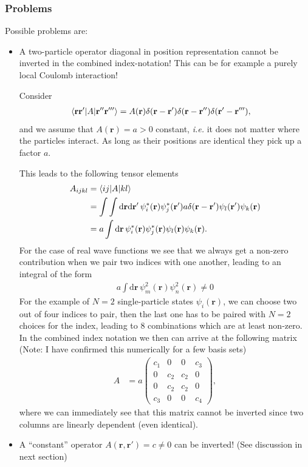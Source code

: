 \documentclass[12pt,a4paper]{scrartcl}
\numberwithin{equation}{section}
\newcommand{\cng}[1]{{\color{red}#1}}
\renewcommand{\vec}{\mathbf}
\begin{document}
\subsubsection{Problems}
Possible problems are:
\begin{itemize}
\item A two-particle operator diagonal in position representation cannot be inverted
in the combined index-notation! This can be for example a purely local Coulomb interaction!

Consider 
\begin{align}
 \braket{\vec{r}\vec{r}' | A | \vec{r}''\vec{r}''' }
 &= A(\vec{r}) \delta(\vec{r}-\vec{r}') \delta(\vec{r}-\vec{r}'') \delta(\vec{r}'-\vec{r}'''),
\end{align}
and we assume that $A(\vec{r})=a>0$ constant, \textit{i.e.} it does not matter where the particles interact.
As long as their positions are identical they pick up a factor $a$.

This leads to the following tensor elements
\begin{align}
A_{ijkl} &= \braket{ij | A | kl }  \\
&= \int \int \mathrm{d}\vec{r}\mathrm{d}\vec{r}' \, \psi^*_i(\vec{r})\psi^*_j(\vec{r}') 
                                          a \delta(\vec{r}-\vec{r}') \psi_l(\vec{r}')\psi_k(\vec{r}) \\
&=a  \int \mathrm{d}\vec{r} \, \psi^*_i(\vec{r})\psi^*_j(\vec{r}) 
                                          \psi_l(\vec{r})\psi_k(\vec{r}) .
\end{align}
For the case of real wave functions we see that we always get a non-zero contribution when we pair 
two indices with one another, leading to an integral of the form
\begin{align}
a  \int \mathrm{d}\vec{r} \, \psi^2_m(\vec{r}) \psi^2_n(\vec{r}) \neq 0
\end{align}
For the example of $N=2$ single-particle states $\psi_i(\vec{r})$, we can choose two out of four indices to pair, then
the last one has to be paired with $N=2$ choices for the index, leading to 8 combinations which are at least non-zero.
In the combined index notation we then can arrive at the following matrix 
(\cng{Note: I have confirmed this numerically for a few basis sets})
\begin{align}
 A &= a
 \begin{pmatrix}
  c_1 & 0 & 0 & c_3 \\
  0   & c_2 & c_2 & 0 \\
  0 & c_2 & c_2 & 0 \\
  c_3 & 0 & 0 & c_4 
 \end{pmatrix},
\end{align}
where we can immediately see that this matrix cannot be inverted since two columns are linearly dependent (even identical).

\item A ``constant'' operator $A(\vec{r},\vec{r}')=c\neq 0$  can be inverted! (See discussion in next section)

\end{itemize}
\end{document}
